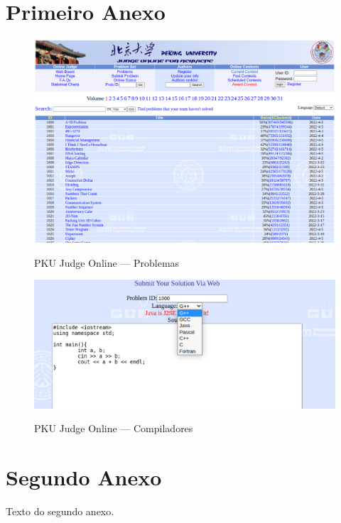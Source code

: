 \begin{anexosenv}

\partanexos
    
\chapter{Primeiro Anexo}

\begin{figure}[H]
    \centering
    \caption{PKU Judge Online — Problemas}
    \includegraphics[keepaspectratio=true,scale=0.35]{figuras/pku.eps}
    \label{fig:pku}
\end{figure}

\begin{figure}[H]
    \centering
    \caption{PKU Judge Online — Compiladores}
    \includegraphics[keepaspectratio=true,scale=0.4]{figuras/pku_2.eps}
    \label{fig:pku_2}
\end{figure}



\chapter{Segundo Anexo}

    Texto do segundo anexo.

\end{anexosenv}


